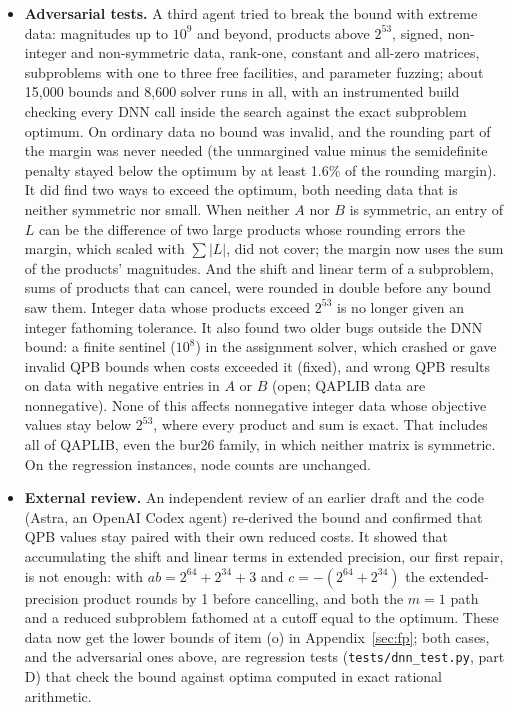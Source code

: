 \documentclass[11pt]{article}
\theoremstyle{remark}
\begin{document}
\begin{itemize}
  and determinism tests, under address, undefined-behavior and leak sanitizers.
  No bound exceeded an optimum and nothing crashed. Its minor findings (and the
  mathematical review's) were fixed: a loop that could skip the last Cholesky
  attempt, widened error constants, an explicit finiteness test on the
  certified value, and skipping the bound while there is no incumbent.
\item \textbf{Adversarial tests.} A third agent tried to break the bound with
  extreme data: magnitudes up to $10^{9}$ and beyond, products above $2^{53}$,
  signed, non-integer and non-symmetric data, rank-one, constant and all-zero
  matrices, subproblems with one to three free facilities, and parameter
  fuzzing; about 15,000 bounds and 8,600 solver runs in all, with an
  instrumented build checking every DNN call inside the search against the
  exact subproblem optimum. On ordinary data no bound was invalid, and the
  rounding part of the margin was never needed (the unmargined value minus the
  semidefinite penalty stayed below the optimum by at least 1.6\% of the rounding
  margin). It did find two ways to exceed the optimum, both needing data that is
  neither symmetric nor small. When neither $A$ nor $B$ is symmetric, an entry of
  $L$ can be the difference of two large products whose rounding errors the
  margin, which scaled with $\sum|L|$, did not cover; the margin now uses the sum
  of the products' magnitudes. And the shift and linear term of a subproblem, sums
  of products that can cancel, were rounded in double before any bound saw them.
  Integer data whose products exceed $2^{53}$ is no longer given an integer
  fathoming tolerance. It also found
  two older bugs outside the DNN bound: a finite sentinel ($10^8$) in the
  assignment solver, which crashed or gave invalid QPB bounds when costs exceeded
  it (fixed), and wrong QPB results on data with negative entries in $A$ or $B$
  (open; QAPLIB data are nonnegative). None of this affects nonnegative integer
  data whose objective values stay below $2^{53}$, where every product and sum is
  exact. That includes all of QAPLIB, even the bur26 family, in which neither
  matrix is symmetric. On the regression instances, node counts are unchanged.
\item \textbf{External review.} An independent review of an earlier draft and the
  code (Astra, an OpenAI Codex agent) re-derived the bound and confirmed that QPB
  values stay paired with their own reduced costs. It showed that accumulating the
  shift and linear terms in extended precision, our first repair, is not enough:
  with $ab = 2^{64}+2^{34}+3$ and $c = -(2^{64}+2^{34})$ the extended-precision
  product rounds by 1 before cancelling, and both the $m=1$ path and a reduced
  subproblem fathomed at a cutoff equal to the optimum. These data now get the
  lower bounds of item (o) in Appendix~\ref{sec:fp}; both cases, and the
  adversarial ones above, are regression tests (\texttt{tests/dnn\_test.py}, part D)
  that check the bound against optima computed in exact rational arithmetic.
\end{itemize}
\end{document}
